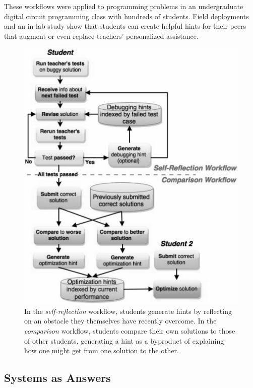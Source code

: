 These workflows were applied to programming problems in an undergraduate digital circuit programming class with hundreds of students. Field deployments and an in-lab study show that students can create helpful hints for their peers that augment or even replace teachers’ personalized assistance. %


\begin{figure}
\centering
\includegraphics[width=1.0\linewidth]{Body/figures/classoverflow/CombinedWorkflow_grey.pdf}
\caption{In the \textit{self-reflection} workflow, students generate hints by reflecting on an obstacle they themselves have recently overcome. In the \textit{comparison} workflow, students compare their own solutions to those of other students, generating a hint as a byproduct of explaining how one might get from one solution to the other.}
\label{fig:betagammaworkflow}
\end{figure}

\subsection{Systems as Answers}

